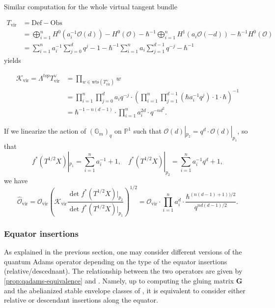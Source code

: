\documentclass[reqno]{amsart}
\numberwithin{equation}{section}
\numberwithin{equation}{section}
\numberwithin{equation}{section}
\theoremstyle{definition}
\theoremstyle{remark}
\theoremstyle{remark}
\begin{document}
Similar computation for the whole virtual tangent bundle

\begin{align}
    T_{\mathrm{vir}} &= \mathrm{Def} - \mathrm{Obs} \\
    &= \bigoplus_{i=1}^n H^0 \left( a_i^{-1} \mathcal{O}(d) \right)  - H^0(\mathcal{O}) - \hbar^{-1} \bigoplus_{i=1}^n H^1(a_i \mathcal{O}(-d)) - \hbar^{-1} H^0(\mathcal{O}) \\
    &= \sum_{i=1}^n a_i^{-1} \sum_{j=0}^d q^j -1 - \hbar^{-1} \sum_{i=1}^n a_i \sum_{j=1}^{d-1} q^{-j} - \hbar^{-1}
\end{align}
yields

\begin{align}
    \mathcal{K}_{\mathrm{vir}} = \Lambda^{top} T^\vee_{\mathrm{vir}} &= \prod_{w \in \mathrm{wts}(T^\vee_{\mathrm{vir}})} w \\ &= \prod_{i=1}^n \prod_{j=0}^d a_i q^{-j}  \cdot \left(  \prod_{i=1}^n \prod_{j=1}^{d-1} (\hbar a_i^{-1} q^j) \cdot 1 \cdot \hbar \right)^{-1} 
    \\
    &= \hbar^{-1-n(d-1)} \cdot \prod_{i=1}^n a_i^{2d} \cdot q^{-nd^2}.
\end{align}

If we linearize the action of $(\mathbb{G}_m)_q$ on $\mathbb{P}^1$ such that $\mathcal{O}(d)|_{p_2} = q^d \cdot \mathcal{O}(d)|_{p_1}$, so that
\begin{equation}
    f^*(T^{1/2}X)|_{p_1} = \sum_{i=1}^n a_i^{-1} + 1 , \quad f^*(T^{1/2}X)|_{p_2} = \sum_{i=1}^n a_i^{-1}q^d  + 1,
\end{equation}
we have
\begin{equation}
    \widehat{\mathcal{O}}_{\mathrm{vir}} =  \mathcal{O}_{\mathrm{vir}} \left( \mathcal{K}_{\mathrm{vir}} \frac{\det f^*(T^{1/2}X )|_{p_2}}{ \det f^*(T^{1/2} X)|_{p_1}} \right)^{1/2} = \mathcal{O}_{\mathrm{vir}} \cdot \prod_{i=1}^n a_i^{d} \cdot \frac{\hbar^{(n(d-1)+1))/2}}{q^{nd(d-1)/2}}.
\end{equation}

\subsubsection{Equator insertions}

As explained in the previous section, one may consider different versions of the quantum Adams operator depending on the type of the equator insertions (relative/descednant). The relationship between the two operators are given by \cref{prop:qadams-equivalence} and \cite{aganagic-okounkov-bethe}. Namely, up to computing the gluing matrix $\mathbf{G}$ and the abelianized stable envelope classes of \cite{aganagic-okounkov-bethe}, it is equivalent to consider either relative or descendant insertions along the equator.
\end{document}
